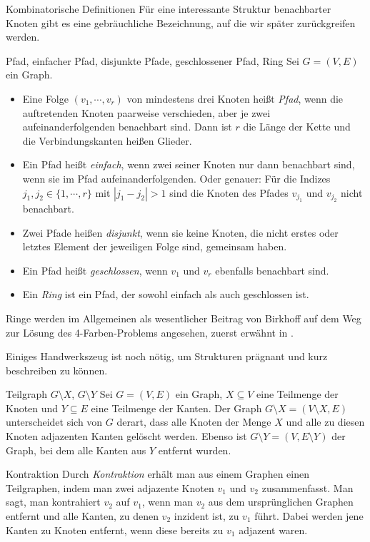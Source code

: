\begin{section}{Kombinatorische Definitionen}
  Für eine interessante Struktur benachbarter Knoten gibt es eine gebräuchliche Bezeichnung, auf die wir später zurückgreifen werden.
  
  \begin{definition}{Pfad, einfacher Pfad, disjunkte Pfade, geschlossener Pfad, Ring}
  Sei $G=(V,E)$ ein Graph.
   \begin{itemize}
    \item Eine Folge $(v_1,\cdots,v_r)$ von mindestens drei Knoten heißt \textit{Pfad}, wenn die auftretenden Knoten paarweise verschieden, aber je zwei aufeinanderfolgenden benachbart sind. Dann ist $r$ die Länge der Kette und die Verbindungskanten heißen Glieder.
    \item Ein Pfad heißt \textit{einfach}, wenn zwei seiner Knoten nur dann benachbart sind, wenn sie im Pfad aufeinanderfolgenden. Oder genauer: Für die Indizes $j_1, j_2 \in \{1,\cdots,r\}$ mit $|j_1 - j_2| > 1$ sind die Knoten des Pfades $v_{j_1}$ und $v_{j_2}$ nicht benachbart.
    \item Zwei Pfade heißen \textit{disjunkt}, wenn sie keine Knoten, die nicht erstes oder letztes Element der jeweiligen Folge sind, gemeinsam haben. 
    \item Ein Pfad heißt \textit{geschlossen}, wenn $v_1$ und $v_r$ ebenfalls benachbart sind.
    \item Ein \textit{Ring} ist ein Pfad, der sowohl einfach als auch geschlossen ist.
   \end{itemize}
  \end{definition}
  
  Ringe werden im Allgemeinen als wesentlicher Beitrag von Birkhoff auf dem Weg zur Lösung des 4-Farben-Problems angesehen, zuerst erwähnt in \cite{AmJMath35}.

  Einiges Handwerkszeug ist noch nötig, um Strukturen prägnant und kurz beschreiben zu können.
  
  \begin{definition}{Teilgraph $G\setminus X$, $G\setminus Y$}
   Sei $G=(V,E)$ ein Graph, $X \subseteq V$ eine Teilmenge der Knoten und $Y \subseteq E$ eine Teilmenge der Kanten. Der Graph $G\setminus X = (V\setminus X,E)$ unterscheidet sich von $G$ derart, dass alle Knoten der Menge $X$ und alle zu diesen Knoten adjazenten Kanten gelöscht werden. Ebenso ist $G\setminus Y = (V,E\setminus Y)$ der Graph, bei dem alle Kanten aus $Y$ entfernt wurden.
  \end{definition}
  
  \begin{definition}{Kontraktion}
   Durch \textit{Kontraktion} erhält man aus einem Graphen einen Teilgraphen, indem man zwei adjazente Knoten $v_1$ und $v_2$ zusammenfasst. Man sagt, man kontrahiert $v_2$ auf $v_1$, wenn man $v_2$ aus dem ursprünglichen Graphen entfernt und alle Kanten, zu denen $v_2$ inzident ist, zu $v_1$ führt. Dabei werden jene Kanten zu Knoten entfernt, wenn diese bereits zu $v_1$ adjazent waren.
  \end{definition}


\end{section}
